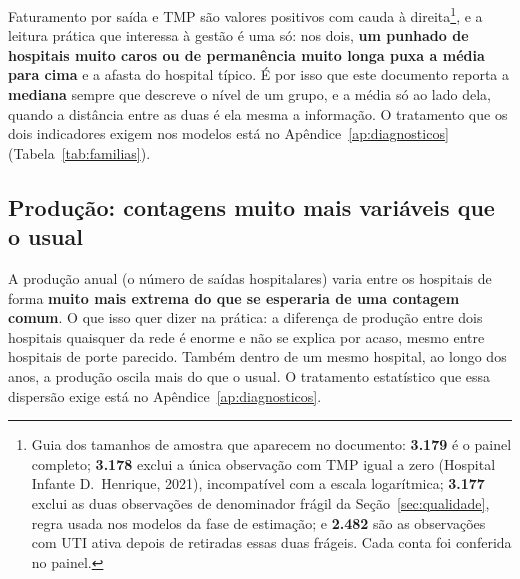 Faturamento por saída e TMP são valores positivos com cauda à
direita\footnote{Guia dos tamanhos de amostra que
aparecem no documento: \textbf{3.179} é o painel completo;
\textbf{3.178} exclui a única observação com TMP igual a zero (Hospital
Infante D.\ Henrique, 2021), incompatível com a escala logarítmica;
\textbf{3.177} exclui as duas observações de
denominador frágil da Seção~\ref{sec:qualidade}, regra usada nos
modelos da fase de estimação; e \textbf{2.482} são as observações com
UTI ativa depois de retiradas essas duas frágeis. Cada conta foi
conferida no painel.}, e a leitura prática que interessa à gestão é uma
só: nos dois, \textbf{um punhado de hospitais muito caros ou de
permanência muito longa puxa a média para cima} e a afasta do hospital
típico. É por isso que este documento reporta a \textbf{mediana} sempre
que descreve o nível de um grupo, e a média só ao lado dela, quando a
distância entre as duas é ela mesma a informação. O tratamento que os dois
indicadores exigem nos modelos está no
Apêndice~\ref{ap:diagnosticos} (Tabela~\ref{tab:familias}).


\subsection{Produção: contagens muito mais variáveis que o usual}

A produção anual (o número de saídas hospitalares) varia entre os
hospitais de forma \textbf{muito mais extrema do que se esperaria de uma
contagem comum}. O que isso quer dizer na prática: a diferença de
produção entre dois hospitais quaisquer da rede é enorme e não se
explica por acaso, mesmo entre hospitais de porte parecido. Também
dentro de um mesmo hospital, ao longo dos anos, a produção oscila mais
do que o usual. O tratamento estatístico que essa dispersão exige está
no Apêndice~\ref{ap:diagnosticos}.
